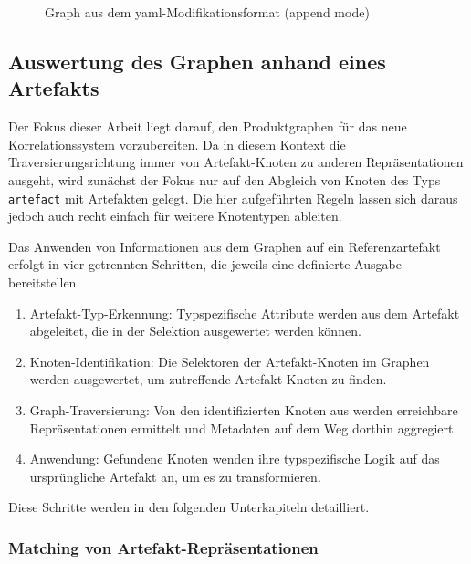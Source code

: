 \begin{figure}[htbp]
    \centering
    \makebox[\textwidth]{}
    \caption{Graph aus dem \acrshort{yaml}-Modifikationsformat (append mode)}
    \label{fig:modell-graph-modification-yaml-demo-append-rendered}
\end{figure}

\subsection{Auswertung des Graphen anhand eines Artefakts}\label{subsec:model-apply-to-artifact}

Der Fokus dieser Arbeit liegt darauf, den Produktgraphen für das neue Korrelationssystem vorzubereiten.
Da in diesem Kontext die Traversierungsrichtung immer von Artefakt-Knoten zu anderen Repräsentationen ausgeht, wird zunächst der Fokus nur auf den Abgleich von Knoten des Typs \texttt{artefact} mit Artefakten gelegt.
Die hier aufgeführten Regeln lassen sich daraus jedoch auch recht einfach für weitere Knotentypen ableiten.

Das Anwenden von Informationen aus dem Graphen auf ein Referenzartefakt erfolgt in vier getrennten Schritten, die jeweils eine definierte Ausgabe bereitstellen.

\begin{enumerate}
    \itemsep0em
    \item Artefakt-Typ-Erkennung: Typspezifische Attribute werden aus dem Artefakt abgeleitet, die in der Selektion ausgewertet werden können.
    \item Knoten-Identifikation: Die Selektoren der Artefakt-Knoten im Graphen werden ausgewertet, um zutreffende Artefakt-Knoten zu finden.
    \item Graph-Traversierung: Von den identifizierten Knoten aus werden erreichbare Repräsentationen ermittelt und Metadaten auf dem Weg dorthin aggregiert.
    \item Anwendung: Gefundene Knoten wenden ihre typspezifische Logik auf das ursprüngliche Artefakt an, um es zu transformieren.
\end{enumerate}

Diese Schritte werden in den folgenden Unterkapiteln detailliert.

\subsubsection{Matching von Artefakt-Repräsentationen}\label{subsubsec:model-matching}

